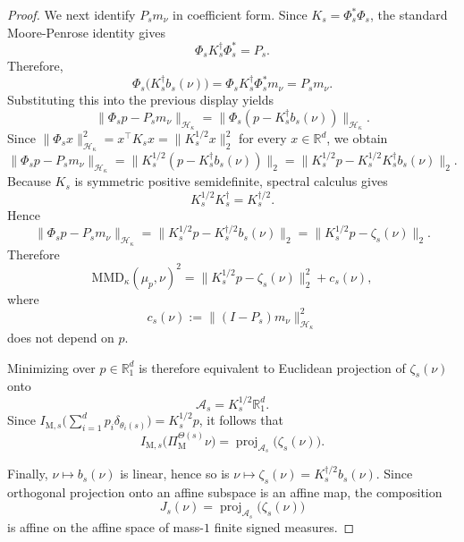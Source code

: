 \documentclass{article}
\begin{document}
\begin{proof}
We next identify $P_s m_\nu$ in coefficient form. Since $K_s=\Phi_s^*\Phi_s$, the standard Moore-Penrose identity gives
\begin{equation}
\Phi_s K_s^\dagger \Phi_s^* = P_s .
\end{equation}
Therefore,
\begin{equation}
\Phi_s\bigl(K_s^\dagger b_s(\nu)\bigr) = \Phi_s K_s^\dagger \Phi_s^* m_\nu = P_s m_\nu .
\end{equation}
Substituting this into the previous display yields
\begin{equation}
\lVert \Phi_s p - P_s m_\nu \rVert_{\mathcal H_\kappa} = \lVert \Phi_s(p-K_s^\dagger b_s(\nu)) \rVert_{\mathcal H_\kappa}.
\end{equation}
Since $\lVert \Phi_s x \rVert_{\mathcal H_\kappa}^2 = x^\top K_s x = \lVert K_s^{1/2}x \rVert_2^2$ for every $x \in \mathbb R^d$, we obtain
\begin{equation}
\lVert \Phi_s p - P_s m_\nu \rVert_{\mathcal H_\kappa} = \lVert K_s^{1/2}(p-K_s^\dagger b_s(\nu)) \rVert_2 = \lVert K_s^{1/2}p - K_s^{1/2}K_s^\dagger b_s(\nu) \rVert_2 .
\end{equation}
Because $K_s$ is symmetric positive semidefinite, spectral calculus gives
\begin{equation}
K_s^{1/2}K_s^\dagger = K_s^{\dagger/2}.
\end{equation}
Hence
\begin{equation}
\lVert \Phi_s p - P_s m_\nu \rVert_{\mathcal H_\kappa} = \lVert K_s^{1/2}p - K_s^{\dagger/2} b_s(\nu) \rVert_2 = \lVert K_s^{1/2}p - \zeta_s(\nu) \rVert_2 .
\end{equation}
Therefore
\begin{equation}
\mathrm{MMD}_\kappa(\mu_p,\nu)^2 = \lVert K_s^{1/2}p - \zeta_s(\nu) \rVert_2^2 + c_s(\nu),
\end{equation}
where
\begin{equation}
c_s(\nu) := \lVert (I-P_s)m_\nu \rVert_{\mathcal H_\kappa}^2
\end{equation}
does not depend on $p$.

Minimizing over $p \in \mathbb R_1^d$ is therefore equivalent to Euclidean projection of $\zeta_s(\nu)$ onto
\begin{equation}
\mathcal A_s = K_s^{1/2}\mathbb R_1^d .
\end{equation}
Since $I_{\mathrm M,s}\bigl(\sum_{i=1}^d p_i\delta_{\theta_i(s)}\bigr)=K_s^{1/2}p$, it follows that
\begin{equation}
I_{\mathrm M,s}\bigl(\Pi_{\mathrm M}^{\Theta(s)}\nu\bigr) = \operatorname{proj}_{\mathcal A_s}\bigl(\zeta_s(\nu)\bigr).
\end{equation}

Finally, $\nu \mapsto b_s(\nu)$ is linear, hence so is $\nu \mapsto \zeta_s(\nu)=K_s^{\dagger/2}b_s(\nu)$. Since orthogonal projection onto an affine subspace is an affine map, the composition
\begin{equation}
J_s(\nu) = \operatorname{proj}_{\mathcal A_s}\bigl(\zeta_s(\nu)\bigr)
\end{equation}
is affine on the affine space of mass-$1$ finite signed measures.
\end{proof}
\end{document}
